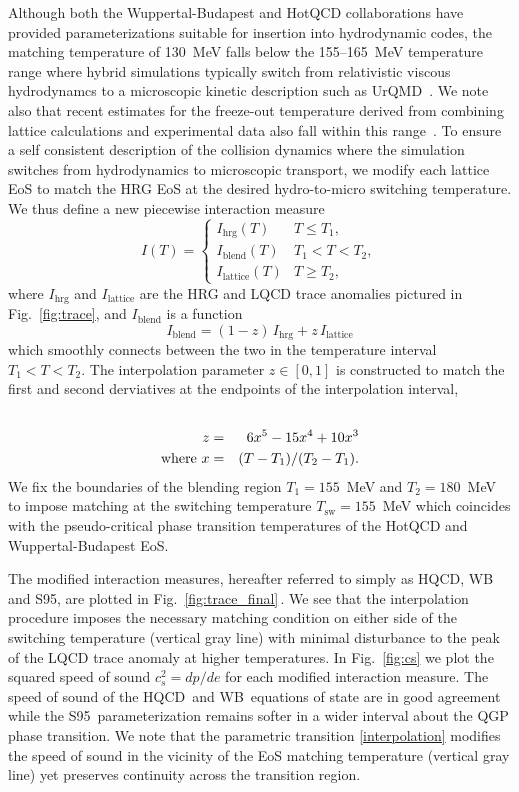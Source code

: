 \documentclass[aps,prc,reprint,amsmath,nofootinbib,superscriptaddress]{revtex4-1}
\newcommand{\hotqcd}{HQCD~}
\newcommand{\wb}{WB~}
\newcommand{\spv}{S95~}
\begin{document}
Although both the Wuppertal-Budapest and HotQCD collaborations have provided parameterizations suitable for insertion into hydrodynamic codes, the matching temperature of 130~MeV falls below the 155--165~MeV temperature range where hybrid simulations typically switch from relativistic viscous hydrodynamcs to a microscopic kinetic description such as UrQMD~\cite{Bass:1998ca,Bleicher:1999xi}.  
We note also that recent estimates for the freeze-out temperature derived from combining lattice calculations and experimental data also fall within this range~\cite{Bazavov:2014xya, Adare:2015aqk}.  
To ensure a self consistent description of the collision dynamics where the simulation switches from hydrodynamics to microscopic transport, we modify each lattice EoS to match the HRG EoS at the desired hydro-to-micro switching temperature. We thus define a new piecewise interaction measure
\begin{equation}
 \label{interaction}
 I(T) =
  \begin{cases}
   I_\text{hrg}(T)	& T \le T_1, \\
   I_\text{blend}(T)	& T_1 < T < T_2, \\ 
   I_\text{lattice}(T)	& T \ge T_2,
  \end{cases}
\end{equation}
where $I_\text{hrg}$ and $I_\text{lattice}$ are the HRG and LQCD trace anomalies pictured in Fig.~\ref{fig:trace}, and $I_\text{blend}$ is a function 
\begin{equation}
  \label{interpolation}
  I_\text{blend} = (1-z)\, I_\text{hrg} + z\, I_\text{lattice}
\end{equation}
which smoothly connects between the two in the temperature interval $T_1 < T < T_2$. The interpolation parameter $z \in [0,1]$ is constructed to match the first and second derviatives at the endpoints of the interpolation interval,
\begin{eqnarray}
 \label{smoothstep}
 \cr z &=& 6 x^5 - 15 x^4 + 10 x^3 \\
  \text{where } x &=& (T - T_1)/(T_2 - T_1).
\end{eqnarray}
We fix the boundaries of the blending region $T_1=155$~MeV and $T_2=180$~MeV to impose matching at the switching temperature $T_\text{sw} = 155$~MeV which coincides with the pseudo-critical phase transition temperatures of the HotQCD and Wuppertal-Budapest EoS. 

The modified interaction measures, hereafter referred to simply as HQCD, WB and S95, are plotted in Fig.~\ref{fig:trace_final}\,. 
We see that the interpolation procedure imposes the necessary matching condition on either side of the switching temperature (vertical gray line) with minimal disturbance to the peak of the LQCD trace anomaly at higher temperatures.
In Fig.~\ref{fig:cs} we plot the squared speed of sound $c_s^2 = dp/de$ for each modified interaction measure. The speed of sound of the \hotqcd and \wb equations
of state are in good agreement while the \spv parameterization remains softer in a wider interval about the QGP phase transition. We note that the parametric transition 
\eqref{interpolation} modifies the speed of sound in the vicinity of the EoS matching temperature (vertical gray line) yet preserves continuity across the transition region.
\end{document}
